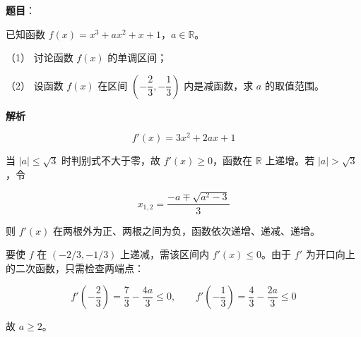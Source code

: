 \begin{answer}

\textbf{题目}：

已知函数 $f(x)=x^3+ax^2+x+1$，$a\in\mathbb R$。

（1） 讨论函数 $f(x)$ 的单调区间；

（2） 设函数 $f(x)$ 在区间 $\left(-\dfrac23,-\dfrac13\right)$ 内是减函数，求 $a$ 的取值范围。

\textbf{解析}


\nopagebreak[4]
\[
f'(x)=3x^2+2ax+1
\]

当 $|a|\leqslant\sqrt3$ 时判别式不大于零，故 $f'(x)\geqslant0$，函数在 $\mathbb R$ 上递增。若 $|a|>\sqrt3$，令

\nopagebreak[4]
\[
x_{1,2}=\frac{-a\mp\sqrt{a^2-3}}{3}
\]

则 $f'(x)$ 在两根外为正、两根之间为负，函数依次递增、递减、递增。


要使 $f$ 在 $(-2/3,-1/3)$ 上递减，需该区间内 $f'(x)\leqslant0$。由于 $f'$ 为开口向上的二次函数，只需检查两端点：

\nopagebreak[4]
\[
f'\left(-\frac23\right)=\frac73-\frac{4a}{3}\leqslant0,\qquad
f'\left(-\frac13\right)=\frac43-\frac{2a}{3}\leqslant0
\]

故 $a\geqslant2$。



\end{answer}
